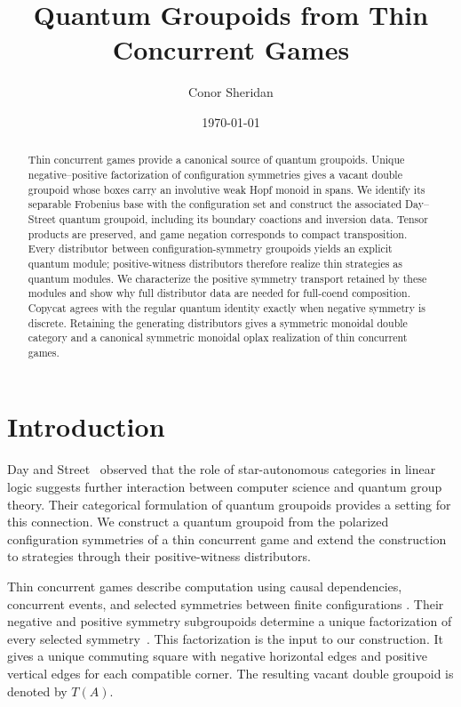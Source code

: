 \documentclass[oneside]{article}
\title{Quantum Groupoids from Thin Concurrent Games}
\author{Conor Sheridan}
\date{\today}
\theoremstyle{plain}
\theoremstyle{definition}
\theoremstyle{remark}
\begin{document}
\maketitle

\begin{abstract}
Thin concurrent games provide a canonical source of quantum groupoids.
Unique negative--positive factorization of configuration symmetries gives
a vacant double groupoid whose boxes carry an involutive weak Hopf monoid
in spans. We identify its separable Frobenius base with the configuration
set and construct the associated Day--Street quantum groupoid, including
its boundary coactions and inversion data. Tensor products are preserved,
and game negation corresponds to compact transposition. Every distributor
between configuration-symmetry groupoids yields an explicit quantum
module; positive-witness distributors therefore realize thin strategies
as quantum modules. We characterize the positive symmetry transport
retained by these modules and show why full distributor data are needed
for full-coend composition. Copycat agrees with the regular quantum
identity exactly when negative symmetry is discrete. Retaining the
generating distributors gives a symmetric monoidal double category and
a canonical symmetric monoidal oplax realization of thin concurrent games.
\end{abstract}

\tableofcontents

\section{Introduction}
\label{sec:cgqg-introduction}

Day and Street~\cite{DayStreet2004} observed that the role of
star-autonomous categories in linear logic suggests further interaction
between computer science and quantum group theory. Their categorical
formulation of quantum groupoids provides a setting for this connection.
We construct a quantum groupoid from the polarized configuration
symmetries of a thin concurrent game and extend the construction to
strategies through their positive-witness distributors.

Thin concurrent games describe computation using causal dependencies,
concurrent events, and selected symmetries between finite configurations
\cite{CastellanClairambaultWinskel2019}. Their negative and positive
symmetry subgroupoids determine a unique factorization of every selected
symmetry~\cite[Lemma~5.3]{ClairambaultOlimpieriPaquet2025}. This
factorization is the input to our construction. It gives a unique
commuting square with negative horizontal edges and positive vertical
edges for each compatible corner. The resulting vacant double groupoid
is denoted by \(T(A)\).
\end{document}
